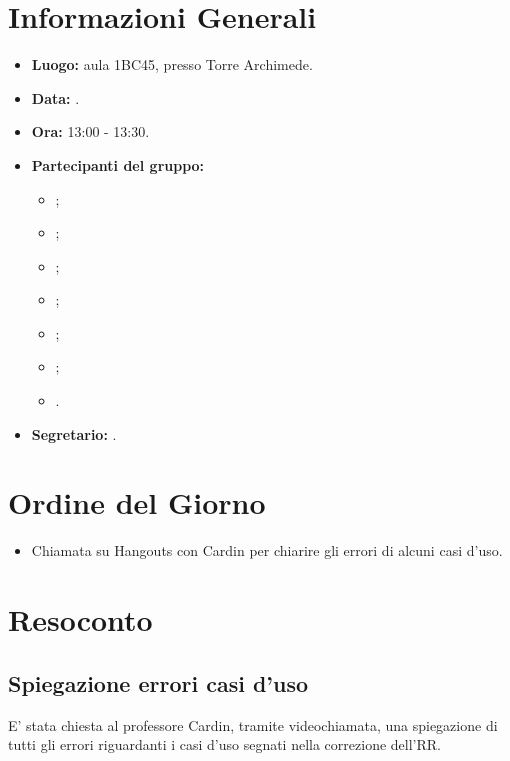 \section{Informazioni Generali}
\begin{itemize}
\item \textbf{Luogo:} aula 1BC45, presso Torre Archimede.
\item \textbf{Data:} \Data.
\item \textbf{Ora:} 13:00 - 13:30.
\item \textbf{Partecipanti del gruppo:}
	\begin{itemize}
		\item \AT{}; 
		\item \CE{}; 
		\item \DF{};
		\item \LD{};
		\item \MC{};
		\item \PF{};
		\item \SE{}.
	\end{itemize} 
\item \textbf{Segretario:} \SE{}.
\end{itemize}

\section{Ordine del Giorno}
\begin{itemize}
	\item Chiamata su Hangouts con Cardin per chiarire gli errori di alcuni casi d'uso.
\end{itemize}


\section{Resoconto}
\subsection{Spiegazione errori casi d'uso}
E' stata chiesta al professore Cardin, tramite videochiamata, una spiegazione di tutti gli errori riguardanti i casi d'uso segnati nella correzione dell'RR.\\
